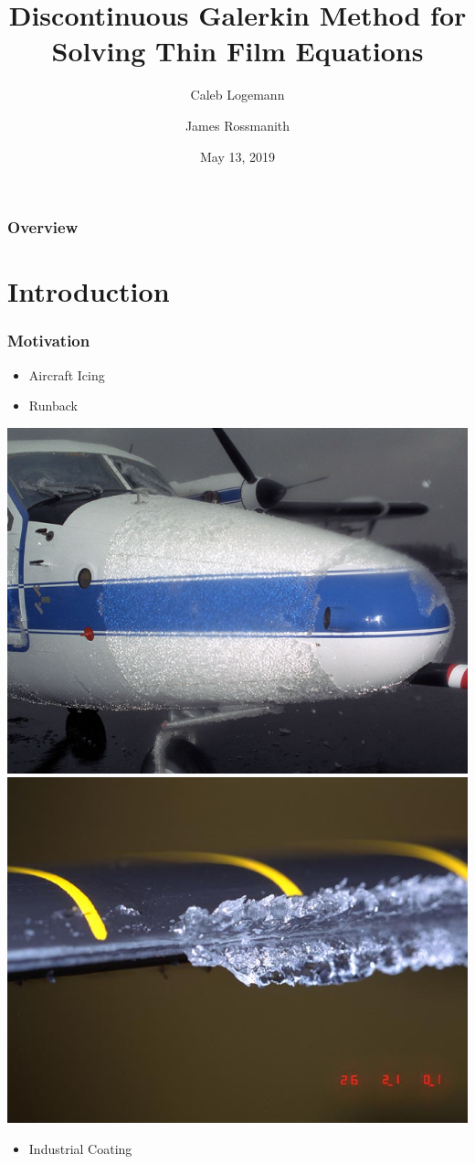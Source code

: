 \documentclass[10pt]{beamer}
\title[]{Discontinuous Galerkin Method for Solving Thin Film Equations} %
\author{Caleb Logemann \and James Rossmanith} %
\institute[Iowa State University]{%
Mathematics Department,\\ Iowa State University \\ %
\medskip
\textit{logemann@iastate.edu}} %
\date{May 13, 2019} %
\begin{document}
  \begin{frame}
    \titlepage{}
  \end{frame}

  \begin{frame}
    \frametitle{Overview}
    \tableofcontents
  \end{frame}

  \section{Introduction}
    \begin{frame}
      \frametitle{Motivation}
      \begin{itemize}
        \item Aircraft Icing
        \item Runback
      \end{itemize}
      \begin{center}
        \includegraphics[scale=0.2]{Figures/Icing_on_a_plane.jpg}
        \hspace{0.1in}
        \includegraphics[scale=0.2]{Figures/Icing_on_a_rotor.jpg}
      \end{center}
      \begin{itemize}
        \item Industrial Coating
      \end{itemize}
    \end{frame}
\end{document}
